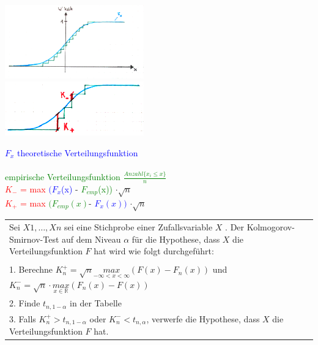 	\begin{minipage}{6cm}
    \includegraphics[width=6cm]{./bilder/ks1.png}\\
    \includegraphics[width=6cm]{./bilder/ks2.png}\\
    \end{minipage}
	\begin{minipage}{12cm}
    \textcolor{blue}{$F_x$ theoretische Verteilungsfunktion}\\ \\
    \vspace{15mm}
    \textcolor{green}{empirische Verteilungsfunktion $\frac{Anzahl\{x_i \leq
    x \}}{n}$}\\

    \textcolor{red}{$K_-$ = max}
    \textcolor{blue}{$(F_x$(x)} -
    \textcolor{green}{$F_{emp}$(x))} 
    $\cdot\sqrt{n}$ \\
    \textcolor{red}{$K_{+}$ = max} 
    \textcolor{green}{$(F_{emp}(x)$}-
    \textcolor{blue}{$F_x(x))$}
    $\cdot\sqrt{n}$ \\

    \end{minipage}

	\begin{tabular}{p{18cm}}
		Sei $X1,\ldots,Xn$ sei eine Stichprobe einer Zufallsvariable $X$ . Der
		Kolmogorov- Smirnov-Test auf dem Niveau $\alpha$ für die Hypothese, 
		dass $X$ die Verteilungsfunktion $F$ hat wird wie folgt durchgeführt: \\ \\
		1. Berechne 
		$K_n^+ = \sqrt{n} \underset{-\infty<x<\infty}{max}(F(x)-F_n(x))$ und
		$K_n^- = \sqrt{n} \cdot \underset{x \in \mathbb{R}}{max}(F_n(x)-F(x))$  \\
		2. Finde $t_{n,1-\alpha}$ in der Tabelle\\ 
		3. Falls $K^+_n > t_{n,1-\alpha}$ oder $K^-_n < t_{n,\alpha}$,
		verwerfe die Hypothese, dass $X$ die Verteilungsfunktion $F$ hat. 
	\end{tabular}